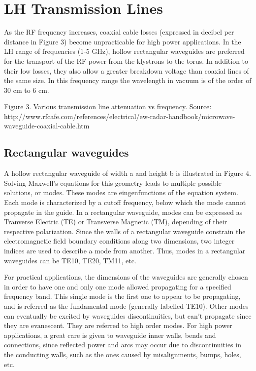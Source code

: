 \section{LH Transmission Lines}
As the RF frequency increases, coaxial cable losses (expressed in decibel per distance in Figure 3) become unpracticable for high power applications. In the LH range of frequencies (1-5 GHz), hollow rectangular waveguides are preferred for the transport of the RF power from the klystrons to the torus. In addition to their low losses, they also allow a greater breakdown voltage than coaxial lines of the same size. In this frequency range the wavelength in vacuum is of the order of 30 cm to 6 cm.

Figure 3. Various transmission line attenuation vs frequency. Source: http://www.rfcafe.com/references/electrical/ew-radar-handbook/microwave-waveguide-coaxial-cable.htm

\subsection{Rectangular waveguides} 
A hollow rectangular waveguide of width a and height b is illustrated in Figure 4. Solving Maxwell’s equations for this geometry leads to multiple possible solutions, or modes. These modes are eingenfunctions of the equation system. Each mode is characterized by a cutoff frequency, below which the mode cannot propagate in the guide. In a rectangular waveguide, modes can be expressed as Tranverse Electric (TE) or Transverse Magnetic (TM), depending of their respective polarization. Since the walls of a rectangular waveguide constrain the electromagnetic field boundary conditions along two dimensions, two integer indices are used to describe a mode from another. Thus, modes in a rectangular waveguides can be TE10, TE20, TM11, etc. 

For practical applications, the dimensions of the waveguides are generally chosen in order to have one and only one mode allowed propagating for a specified frequency band. This single mode is the first one to appear to be propagating, and is referred as the fundamental mode (generally labelled TE10). Other modes can eventually be excited by waveguides discontinuities, but can’t propagate since they are evanescent. They are referred to high order modes.
For high power applications, a great care is given to waveguide inner walls, bends and connections, since reflected power and arcs may occur due to discontinuities in the conducting walls, such as the ones caused by misalignments, bumps, holes, etc.

